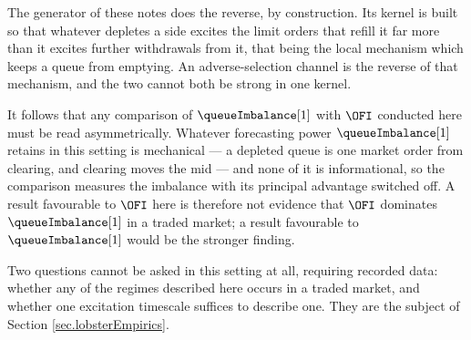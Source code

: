 The generator of these notes does the reverse, by construction.
Its kernel is built so that whatever depletes a side excites the limit orders that refill it
far more than it excites further withdrawals from it,
that being the local mechanism which keeps a queue from emptying.
An adverse-selection channel is the reverse of that mechanism,
and the two cannot both be strong in one kernel.

\begin{remark}\label{remark.asymmetricReading}
 It follows that any comparison of $\queueImbalance[1]$ with $\OFI$ conducted here must be
 read asymmetrically.
 Whatever forecasting power $\queueImbalance[1]$ retains in this setting is mechanical ---
 a depleted queue is one market order from clearing, and clearing moves the mid --- and
 none of it is informational,
 so the comparison measures the imbalance with its principal advantage switched off.
 A result favourable to $\OFI$ here is therefore not evidence that $\OFI$ dominates
 $\queueImbalance[1]$ in a traded market;
 a result favourable to $\queueImbalance[1]$ would be the stronger finding.
\end{remark}

Two questions cannot be asked in this setting at all, requiring recorded data:
whether any of the regimes described here occurs in a traded market,
and whether one excitation timescale suffices to describe one.
They are the subject of Section \ref{sec.lobsterEmpirics}.
